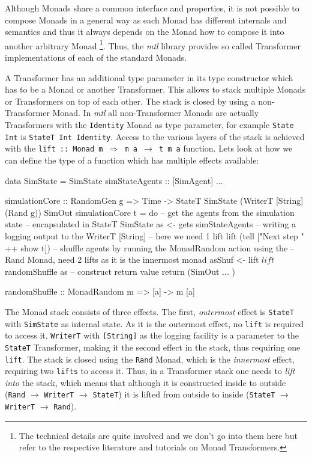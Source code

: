 Although Monads share a common interface and properties, it is not possible to compose Monads in a general way as each Monad has different internals and semantics and thus it always depends on the Monad how to compose it into another arbitrary Monad \footnote{The technical details are quite involved and we don't go into them here but refer to the respective literature and tutorials on Monad Transformers.}. Thus, the \textit{mtl} library provides so called Transformer implementations of each of the standard Monads.

A Transformer has an additional type parameter in its type constructor which has to be a Monad or another Transformer. This allows to stack multiple Monads or Transformers on top of each other. The stack is closed by using a non-Transformer Monad. In \textit{mtl} all non-Transformer Monads are actually Transformers with the \texttt{Identity} Monad as type parameter, for example \texttt{State Int} is \texttt{StateT Int Identity}. Access to the various layers of the stack is achieved with the \texttt{lift :: Monad m $\Rightarrow$ m a $\rightarrow$ t m a} function. Lets look at how we can define the type of a function which has multiple effects available:

\begin{HaskellCode}
data SimState = SimState { simStateAgents :: [SimAgent] ... }

simulationCore :: RandomGen g 
               => Time
               -> StateT SimState (WriterT [String] (Rand g)) SimOut
simulationCore t = do
  -- get the agents from the simulation state 
  -- encapsulated in StateT SimState
  as <- gets simStateAgents
  -- writing a logging output to the WriterT [String]
  -- here we need 1 lift 
  lift (tell ["Next step " ++ show t])
  -- shuffle agents by running the MonadRandom action using the
  -- Rand Monad, need 2 lifts as it is the innermost monad
  asShuf <- lift $ lift $ randomShuffle as
  -- construct return value
  return (SimOut { ... })
  
randomShuffle :: MonadRandom m => [a] -> m [a]
\end{HaskellCode}

The Monad stack consists of three effects. The first, \textit{outermost} effect is \texttt{StateT} with \texttt{SimState} as internal state. As it is the outermost effect, no \texttt{lift} is required to access it. \texttt{WriterT} with \texttt{[String]} as the logging facility is a parameter to the \texttt{StateT} Transformer, making it the second effect in the stack, thus requiring one \texttt{lift}. The stack is closed using the \texttt{Rand} Monad, which is the \textit{innermost} effect, requiring two \texttt{lifts} to access it. Thus, in a Transformer stack one needs to \textit{lift into} the stack, which means that although it is constructed inside to outside (\texttt{Rand} $\rightarrow$ \texttt{WriterT} $\rightarrow$ \texttt{StateT}) it is lifted from outside to inside (\texttt{StateT} $\rightarrow$ \texttt{WriterT} $\rightarrow$ \texttt{Rand}).

